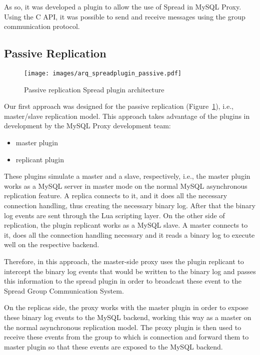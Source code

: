 As so, it was developed a plugin to allow the use of Spread in MySQL Proxy. Using the C API, it was possible to send and receive messages using the group communication protocol.



\subsection{Passive Replication}


\begin{figure}[h!]
\centering    
\texttt{[image: images/arq\_spreadplugin\_passive.pdf]}
\caption{Passive replication Spread plugin architecture}
\label{fig:spread_plugin_passive}
\end{figure}

Our first approach was designed for the passive replication (Figure~\ref{fig:spread_plugin_passive}), i.e., master/slave replication model. This approach takes advantage of the plugins in development by the MySQL Proxy development team:

\begin{itemize}
	\item master plugin
	\item replicant plugin
\end{itemize}

These plugins simulate a master and a slave, respectively, i.e., the master plugin works as a MySQL server in master mode on the normal MySQL asynchronous replication feature. A replica connects to it, and it does all the necessary connection handling, thus creating the necessary binary log. After that the binary log events are sent through the Lua scripting layer.  
On the other side of replication, the plugin replicant works as a MySQL slave. A master connects to it, does all the connection handling necessary and it reads a binary log to execute well on the respective backend. 
 
Therefore, in this approach, the master-side proxy uses the plugin replicant to intercept the binary log events that would be written to the binary log and passes this information to the spread plugin in order to broadcast these event to the Spread Group Communication System. 
 
On the replicas side, the proxy works with the master plugin in order to expose these binary log events to the MySQL backend, working this way as a master on the normal asynchronous replication model. The proxy plugin is then used to receive these events from the group to which is connection and forward them to master plugin so that these events are exposed to the MySQL backend.


